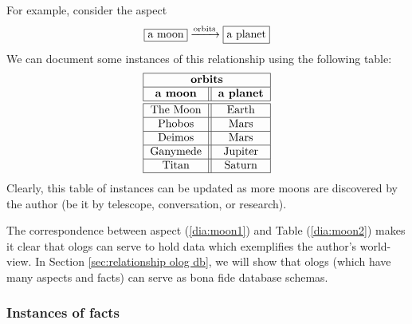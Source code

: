 \documentclass{amsart}
\def\To{\xrightarrow}
\def\To{\xrightarrow}
\theoremstyle{remark}
\theoremstyle{definition}
\def\tn{\textnormal}
\begin{document}
For example, consider the aspect \begin{align}\label{dia:moon1}\fbox{a moon}\To{\tn{orbits}}\fbox{a planet}\end{align}  We can document some instances of this relationship using the following table: \begin{align}\label{dia:moon2}\begin{tabular}{| c || c |}\hline\multicolumn{2}{| c |}{\bf orbits}\\\hline{\bf a moon}&{\bf a planet}\\\hline\hline The Moon&Earth\\\hline Phobos&Mars\\\hline Deimos&Mars\\\hline Ganymede & Jupiter\\\hline Titan & Saturn\\\hline\end{tabular}\end{align}  Clearly, this table of instances can be updated as more moons are discovered by the author (be it by telescope, conversation, or research).

The correspondence between aspect (\ref{dia:moon1}) and Table (\ref{dia:moon2}) makes it clear that ologs can serve to hold data which exemplifies the author's world-view. In Section \ref{sec:relationship olog db}, we will show that ologs (which have many aspects and facts) can serve as bona fide database schemas.

\subsubsection{Instances of facts}
\end{document}
